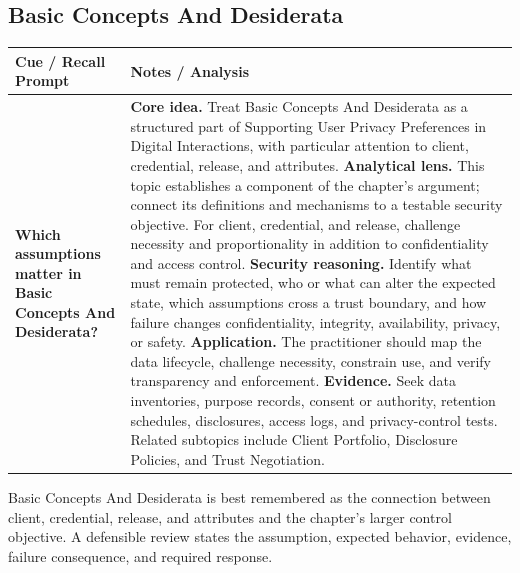 \documentclass[11pt]{article}
\newcommand{\CornellHeader}{%
\rowcolor{Navy}\color{white}\bfseries Cue / Recall Prompt & \color{white}\bfseries Notes / Analysis\\\hline}
\newcommand{\CornellRow}[2]{%
\cellcolor{CueGray}\RaggedRight\textbf{#1} & \RaggedRight #2\\\hline}
\begin{document}
\subsection*{Basic Concepts And Desiderata}
\begin{longtable}{>{\RaggedRight\arraybackslash}p{}|>{\RaggedRight\arraybackslash}p{}}
\CornellHeader
\CornellRow{Which assumptions matter in Basic Concepts And Desiderata?}{\textbf{Core idea.} Treat Basic Concepts And Desiderata as a structured part of Supporting User Privacy Preferences in Digital Interactions, with particular attention to client, credential, release, and attributes. \textbf{Analytical lens.} This topic establishes a component of the chapter's argument; connect its definitions and mechanisms to a testable security objective. For client, credential, and release, challenge necessity and proportionality in addition to confidentiality and access control. \textbf{Security reasoning.} Identify what must remain protected, who or what can alter the expected state, which assumptions cross a trust boundary, and how failure changes confidentiality, integrity, availability, privacy, or safety. \textbf{Application.} The practitioner should map the data lifecycle, challenge necessity, constrain use, and verify transparency and enforcement. \textbf{Evidence.} Seek data inventories, purpose records, consent or authority, retention schedules, disclosures, access logs, and privacy-control tests. Related subtopics include Client Portfolio, Disclosure Policies, and Trust Negotiation.}
\end{longtable}
\begin{topicsummary}
Basic Concepts And Desiderata is best remembered as the connection between client, credential, release, and attributes and the chapter's larger control objective. A defensible review states the assumption, expected behavior, evidence, failure consequence, and required response.
\end{topicsummary}
\end{document}
